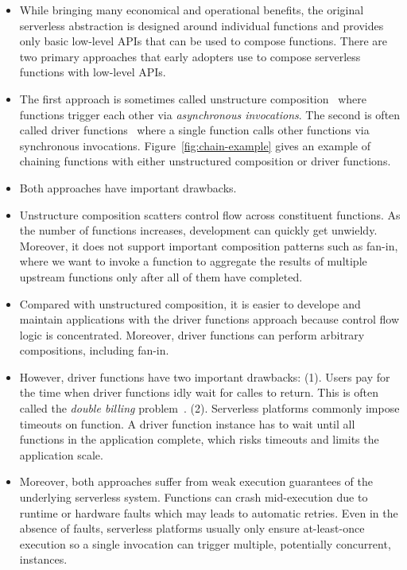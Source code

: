 \begin{itemize}

	\item While bringing many economical and operational benefits, the original
	serverless abstraction is designed around individual functions and
	provides only basic low-level APIs that can be used to compose functions.
	There are two primary approaches that early adopters use to compose
	serverless functions with low-level APIs.

	\item The first approach is sometimes called unstructure
	composition~\cite{netherite} where functions trigger each other via
	\emph{asynchronous invocations}. The second is often called driver
	functions~\cite{beldi} where a single function calls other functions via
	synchronous invocations. Figure~\ref{fig:chain-example} gives an example
	of chaining functions with either unstructured composition or driver
	functions.

	\item Both approaches have important drawbacks.

	\item Unstructure composition scatters control flow across constituent
	functions. As the number of functions increases, development can quickly
	get unwieldy. Moreover, it does not support important composition patterns
	such as fan-in, where we want to invoke a function to aggregate the
	results of multiple upstream functions only after all of them have
	completed.

	\item Compared with unstructured composition, it is easier to develope and
	maintain applications with the driver functions approach because control
	flow logic is concentrated. Moreover, driver functions can perform
	arbitrary compositions, including fan-in.

	\item However, driver functions have two important drawbacks: (1). Users
	pay for the time when driver functions idly wait for calles to return.
	This is often called the \emph{double billing}
	problem~\cite{double-billing}. (2). Serverless platforms commonly impose
	timeouts on function. A driver function instance has to wait until all
	functions in the application complete, which risks timeouts and limits the
	application scale.

	\item Moreover, both approaches suffer from weak execution guarantees of
	the underlying serverless system. Functions can crash mid-execution due to
	runtime or hardware faults which may leads to automatic retries. Even in
	the absence of faults, serverless platforms usually only ensure
	at-least-once execution so a single invocation can trigger multiple,
	potentially concurrent, instances.



\end{itemize}
